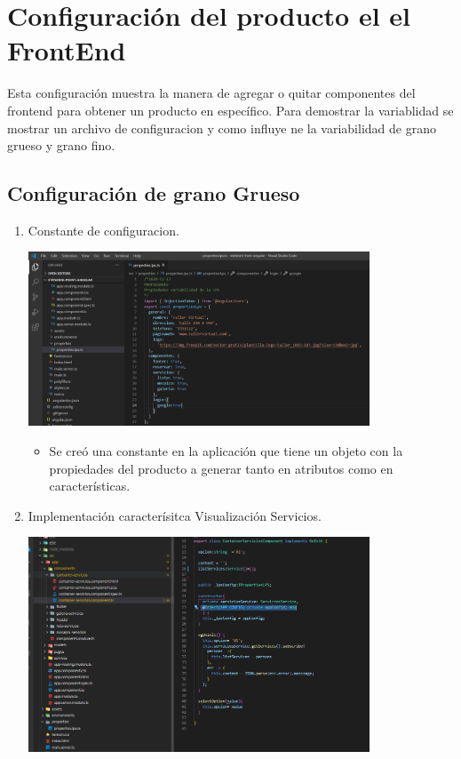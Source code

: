 \documentclass[10pt,a4paper,openany]{book}
\begin{document}
\section{Configuración del producto el el FrontEnd}

Esta configuración muestra la manera de agregar o quitar componentes del frontend para obtener un producto en específico. Para demostrar la variablidad se mostrar un archivo de configuracion y como influye ne la variabilidad de grano grueso y grano fino.

\subsection{Configuración de grano Grueso}

\begin{enumerate}

\item Constante de configuracion.\\
\begin{center}
\includegraphics[width=0.8\textwidth]{oc_4b}
\end{center}
\begin{itemize}

\item Se creó una constante en la aplicación que tiene un objeto con la propiedades del producto a generar tanto en atributos como en características.


\end{itemize}

\item Implementación caracterísitca Visualización Servicios.\\
\begin{center}
\includegraphics[width=0.8\textwidth]{oc_5}


\end{center}
\end{enumerate}
\end{document}
